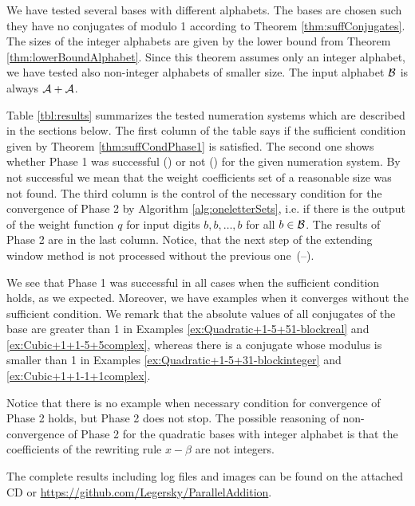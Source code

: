 We have tested several bases with different alphabets. The bases are chosen such they have no conjugates of modulo 1 according to Theorem \ref{thm:suffConjugates}. The sizes of the integer alphabets are given by the lower bound from Theorem \ref{thm:lowerBoundAlphabet}. Since this theorem assumes only an integer alphabet, we have tested also non-integer alphabets of smaller size. The input alphabet $\mathcal{B}$ is always $\mathcal{A}+ \mathcal{A}$.  

 Table \ref{tbl:results} summarizes the tested numeration systems which are described in the sections below. The first column of the table says if the sufficient condition given by Theorem \ref{thm:suffCondPhase1} is satisfied. The second one shows whether Phase 1 was successful (\checkmark) or not (\xmark) for the given numeration system. By not successful we mean that the weight coefficients set of a reasonable size was not found. The third column is the control of the necessary condition for the convergence of Phase 2 by Algorithm \ref{alg:oneletterSets}, i.e. if there is the output of the weight function $q$ for input digits $b,b,\dots,b$ for all $b\in\mathcal{B}$. The results of Phase 2 are in the last column. Notice, that the next step of the extending window method is not processed without the previous one~(--).

We see that Phase 1 was successful in all cases when the sufficient condition holds, as we expected. Moreover, we have examples when it converges without the sufficient condition. We remark that the absolute values of all conjugates of the base are greater than 1 in Examples \ref{ex:Quadratic+1-5+51-blockreal} and \ref{ex:Cubic+1+1-5+5complex}, whereas there is a conjugate whose modulus is smaller than 1 in Examples \ref{ex:Quadratic+1-5+31-blockinteger} and \ref{ex:Cubic+1+1-1+1complex}.

Notice that there is no example when necessary condition for convergence of Phase 2 holds, but Phase 2 does not stop. The possible reasoning of non-convergence of Phase 2 for the quadratic bases with integer alphabet is that the coefficients of the rewriting rule $x-\beta$ are not integers.  

The complete results including log files and images can be found on the attached CD  or \url{https://github.com/Legersky/ParallelAddition}.












